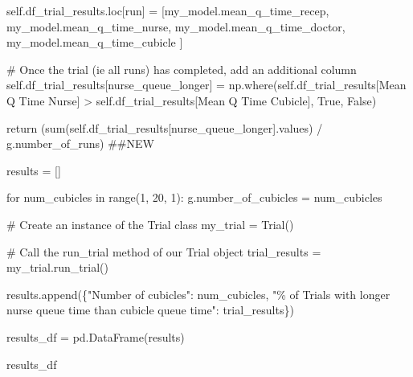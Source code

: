 \documentclass[
  letterpaper,
  DIV=11,
  numbers=noendperiod]{scrreprt}
\newenvironment{Shaded}{}{}
\newcommand{\BuiltInTok}[1]{\textcolor[rgb]{0.84,0.23,0.29}{#1}}
\newcommand{\CommentTok}[1]{\textcolor[rgb]{0.42,0.45,0.49}{#1}}
\newcommand{\ControlFlowTok}[1]{\textcolor[rgb]{0.84,0.23,0.29}{#1}}
\newcommand{\DecValTok}[1]{\textcolor[rgb]{0.00,0.36,0.77}{#1}}
\newcommand{\KeywordTok}[1]{\textcolor[rgb]{0.84,0.23,0.29}{#1}}
\newcommand{\NormalTok}[1]{\textcolor[rgb]{0.14,0.16,0.18}{#1}}
\newcommand{\OperatorTok}[1]{\textcolor[rgb]{0.14,0.16,0.18}{#1}}
\newcommand{\SpecialCharTok}[1]{\textcolor[rgb]{0.00,0.36,0.77}{#1}}
\newcommand{\StringTok}[1]{\textcolor[rgb]{0.01,0.18,0.38}{#1}}
\newcommand{\VariableTok}[1]{\textcolor[rgb]{0.89,0.38,0.04}{#1}}
\begin{document}
\begin{Shaded}
\begin{Highlighting}[]
            \VariableTok{self}\NormalTok{.df\_trial\_results.loc[run] }\OperatorTok{=}\NormalTok{ [my\_model.mean\_q\_time\_recep,}
\NormalTok{                                              my\_model.mean\_q\_time\_nurse,}
\NormalTok{                                              my\_model.mean\_q\_time\_doctor,}
\NormalTok{                                              my\_model.mean\_q\_time\_cubicle}
\NormalTok{                                              ]}

        \CommentTok{\# Once the trial (ie all runs) has completed, add an additional column}
        \VariableTok{self}\NormalTok{.df\_trial\_results[}\StringTok{\textquotesingle{}nurse\_queue\_longer\textquotesingle{}}\NormalTok{] }\OperatorTok{=}\NormalTok{ np.where(}\VariableTok{self}\NormalTok{.df\_trial\_results[}\StringTok{\textquotesingle{}Mean Q Time Nurse\textquotesingle{}}\NormalTok{] }\OperatorTok{\textgreater{}} \VariableTok{self}\NormalTok{.df\_trial\_results[}\StringTok{\textquotesingle{}Mean Q Time Cubicle\textquotesingle{}}\NormalTok{], }\VariableTok{True}\NormalTok{, }\VariableTok{False}\NormalTok{)}

        \ControlFlowTok{return}\NormalTok{ (}\BuiltInTok{sum}\NormalTok{(}\VariableTok{self}\NormalTok{.df\_trial\_results[}\StringTok{\textquotesingle{}nurse\_queue\_longer\textquotesingle{}}\NormalTok{].values) }\OperatorTok{/}\NormalTok{ g.number\_of\_runs) }\CommentTok{\#\#NEW}
\end{Highlighting}
\end{Shaded}

\begin{Shaded}
\begin{Highlighting}[]
\NormalTok{results }\OperatorTok{=}\NormalTok{ []}

\ControlFlowTok{for}\NormalTok{ num\_cubicles }\KeywordTok{in} \BuiltInTok{range}\NormalTok{(}\DecValTok{1}\NormalTok{, }\DecValTok{20}\NormalTok{, }\DecValTok{1}\NormalTok{):}
\NormalTok{    g.number\_of\_cubicles }\OperatorTok{=}\NormalTok{ num\_cubicles}

    \CommentTok{\# Create an instance of the Trial class}
\NormalTok{    my\_trial }\OperatorTok{=}\NormalTok{ Trial()}

    \CommentTok{\# Call the run\_trial method of our Trial object}
\NormalTok{    trial\_results }\OperatorTok{=}\NormalTok{ my\_trial.run\_trial()}

\NormalTok{    results.append(\{}\StringTok{"Number of cubicles"}\NormalTok{: num\_cubicles,}
      \StringTok{"}\SpecialCharTok{\% o}\StringTok{f Trials with longer nurse queue time than cubicle queue time"}\NormalTok{: trial\_results\})}

\NormalTok{results\_df }\OperatorTok{=}\NormalTok{ pd.DataFrame(results)}

\NormalTok{results\_df}
\end{Highlighting}
\end{Shaded}
\end{document}
